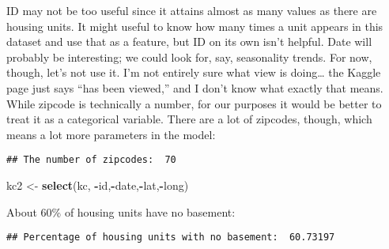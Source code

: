 \documentclass[]{article}
\newenvironment{Shaded}{\begin{snugshade}}{\end{snugshade}}
\newcommand{\KeywordTok}[1]{\textcolor[rgb]{0.13,0.29,0.53}{\textbf{#1}}}
\newcommand{\DecValTok}[1]{\textcolor[rgb]{0.00,0.00,0.81}{#1}}
\newcommand{\StringTok}[1]{\textcolor[rgb]{0.31,0.60,0.02}{#1}}
\newcommand{\OperatorTok}[1]{\textcolor[rgb]{0.81,0.36,0.00}{\textbf{#1}}}
\newcommand{\NormalTok}[1]{#1}
\begin{document}
ID may not be too useful since it attains almost as many values as there
are housing units. It might useful to know how many times a unit appears
in this dataset and use that as a feature, but ID on its own isn't
helpful. Date will probably be interesting; we could look for, say,
seasonality trends. For now, though, let's not use it. I'm not entirely
sure what view is doing\ldots{} the Kaggle page just says ``has been
viewed,'' and I don't know what exactly that means. While zipcode is
technically a number, for our purposes it would be better to treat it as
a categorical variable. There are a lot of zipcodes, though, which means
a lot more parameters in the model:

\begin{Shaded}
\end{Shaded}

\begin{verbatim}
## The number of zipcodes:  70
\end{verbatim}

\begin{Shaded}
\begin{Highlighting}[]
\NormalTok{kc2 <-}\StringTok{ }\KeywordTok{select}\NormalTok{(kc, }\OperatorTok{-}\NormalTok{id,}\OperatorTok{-}\NormalTok{date,}\OperatorTok{-}\NormalTok{lat,}\OperatorTok{-}\NormalTok{long)}
\end{Highlighting}
\end{Shaded}

About 60\% of housing units have no basement:

\begin{Shaded}
\end{Shaded}

\begin{verbatim}
## Percentage of housing units with no basement:  60.73197
\end{verbatim}
\end{document}
